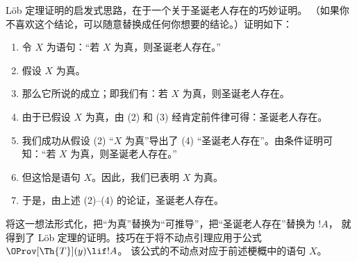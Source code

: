 \documentclass[../../../include/open-logic-section]{subfiles}
\begin{document}
\begin{explain}
L\"ob 定理证明的启发式思路，在于一个关于圣诞老人存在的巧妙证明。
（如果你不喜欢这个结论，可以随意替换成任何你想要的结论。）证明如下：
\begin{enumerate}
\item 令 $X$ 为语句：“若 $X$ 为真，则圣诞老人存在。”
\item 假设 $X$ 为真。
\item 那么它所说的成立；即我们有：若 $X$ 为真，则圣诞老人存在。
\item 由于已假设 $X$ 为真，由 (2) 和 (3) 经肯定前件律可得：圣诞老人存在。
\item 我们成功从假设 (2) “$X$ 为真”导出了 (4) “圣诞老人存在”。由条件证明可知：“若 $X$ 为真，则圣诞老人存在。”
\item 但这恰是语句 $X$。因此，我们已表明 $X$ 为真。
\item 于是，由上述 (2)--(4) 的论证，圣诞老人存在。
\end{enumerate}
将这一想法形式化，把“为真”替换为“可推导”，把“圣诞老人存在”替换为 $!A$，
就得到了 L\"ob 定理的证明。技巧在于将不动点引理应用于公式~$\OProv[\Th{T}](y) \lif !A$。
该公式的不动点对应于前述梗概中的语句 $X$。
\end{explain}
\end{document}
